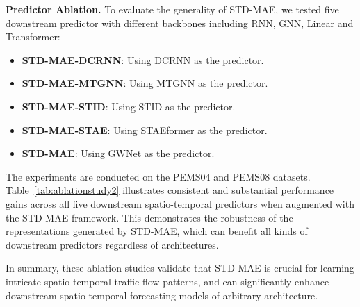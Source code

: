 \documentclass[letterpaper]{article} \usepackage{aaai24}  \usepackage{times}  \usepackage{helvet}  \usepackage{courier}  \usepackage[hyphens]{url}  \usepackage{graphicx} \urlstyle{rm} \def\UrlFont{\rm}  \usepackage{natbib}  \usepackage{caption} \frenchspacing  \setlength{\pdfpagewidth}{8.5in} \setlength{\pdfpageheight}{11in} \usepackage{algorithm}
\begin{document}
\noindent\textbf{Predictor Ablation.} To evaluate the generality of STD-MAE, we tested five downstream predictor with different backbones including RNN, GNN, Linear and Transformer:
\begin{itemize}
  \item \textbf{STD-MAE-DCRNN}: Using DCRNN as the predictor.
  \item \textbf{STD-MAE-MTGNN}: Using MTGNN as the predictor.
  \item \textbf{STD-MAE-STID}: Using STID as the predictor.
  \item \textbf{STD-MAE-STAE}: Using STAEformer as the predictor.
  \item \textbf{STD-MAE}: Using GWNet as the predictor.
 \end{itemize}
The experiments are conducted on the PEMS04 and PEMS08 datasets. Table~\ref{tab:ablationstudy2} illustrates consistent and substantial performance gains across all five downstream spatio-temporal predictors when augmented with the STD-MAE framework. This demonstrates the robustness of the representations generated by STD-MAE, which can benefit all kinds of downstream predictors regardless of architectures.

In summary, these ablation studies validate that STD-MAE is crucial for learning intricate spatio-temporal traffic flow patterns, and can significantly enhance downstream spatio-temporal forecasting models of arbitrary architecture.
\begin{table}[t]
    \renewcommand\arraystretch{1.2}
    \footnotesize
\captionsetup{justification=centering}
		\caption{Predictor Ablation on PEMS04 and PEMS08}
		\label{tab:ablationstudy2}
\end{table}
\end{document}
